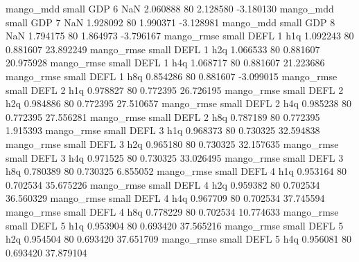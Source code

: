         mango_mdd      small      GDP                 6                  NaN 2.060888 80       2.128580          -3.180130
        mango_mdd      small      GDP                 7                  NaN 1.928092 80       1.990371          -3.128981
        mango_mdd      small      GDP                 8                  NaN 1.794175 80       1.864973          -3.796167
       mango_rmse      small     DEFL                 1                  h1q 1.092243 80       0.881607          23.892249
       mango_rmse      small     DEFL                 1                  h2q 1.066533 80       0.881607          20.975928
       mango_rmse      small     DEFL                 1                  h4q 1.068717 80       0.881607          21.223686
       mango_rmse      small     DEFL                 1                  h8q 0.854286 80       0.881607          -3.099015
       mango_rmse      small     DEFL                 2                  h1q 0.978827 80       0.772395          26.726195
       mango_rmse      small     DEFL                 2                  h2q 0.984886 80       0.772395          27.510657
       mango_rmse      small     DEFL                 2                  h4q 0.985238 80       0.772395          27.556281
       mango_rmse      small     DEFL                 2                  h8q 0.787189 80       0.772395           1.915393
       mango_rmse      small     DEFL                 3                  h1q 0.968373 80       0.730325          32.594838
       mango_rmse      small     DEFL                 3                  h2q 0.965180 80       0.730325          32.157635
       mango_rmse      small     DEFL                 3                  h4q 0.971525 80       0.730325          33.026495
       mango_rmse      small     DEFL                 3                  h8q 0.780389 80       0.730325           6.855052
       mango_rmse      small     DEFL                 4                  h1q 0.953164 80       0.702534          35.675226
       mango_rmse      small     DEFL                 4                  h2q 0.959382 80       0.702534          36.560329
       mango_rmse      small     DEFL                 4                  h4q 0.967709 80       0.702534          37.745594
       mango_rmse      small     DEFL                 4                  h8q 0.778229 80       0.702534          10.774633
       mango_rmse      small     DEFL                 5                  h1q 0.953904 80       0.693420          37.565216
       mango_rmse      small     DEFL                 5                  h2q 0.954504 80       0.693420          37.651709
       mango_rmse      small     DEFL                 5                  h4q 0.956081 80       0.693420          37.879104

